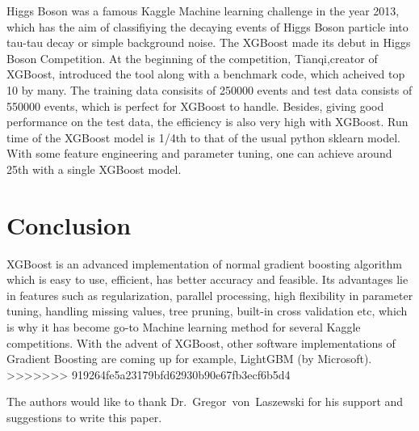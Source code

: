 Higgs Boson was a famous Kaggle Machine learning challenge in the year 2013, which has the 
aim of classifiying the decaying events of Higgs Boson particle into tau-tau decay or simple 
background noise. The XGBoost made its debut in Higgs Boson Competition. At the beginning of 
the competition, Tianqi,creator of XGBoost, introduced the tool along with a benchmark code, 
which acheived top 10%
by many.
The training data consisits of 250000 events and test data consists of 550000 events, which is
perfect for XGBoost to handle. Besides, giving good performance on the test data, the efficiency
is also very high with XGBoost. Run time of the XGBoost model is 1/4th to that of the usual
python sklearn model. With some feature engineering and parameter tuning, one can achieve around
25th with a single XGBoost model.

\section{Conclusion} 

 XGBoost is an advanced implementation of normal gradient boosting algorithm which is
 easy to use, efficient, has better accuracy and feasible. Its advantages lie in features  
 such as regularization, parallel processing, high flexibility in parameter tuning, handling 
 missing values, tree pruning, built-in cross validation etc, which is why it has become go-to
 Machine learning method for several Kaggle competitions. With the advent of XGBoost, other 
 software implementations of Gradient Boosting are coming up for example, LightGBM (by 
 Microsoft).
>>>>>>> 919264fe5a23179bfd62930b90e67fb3ecf6b5d4

\begin{acks}

  The authors would like to thank Dr.~Gregor~von~Laszewski for his
  support and suggestions to write this paper.

\end{acks}


 

